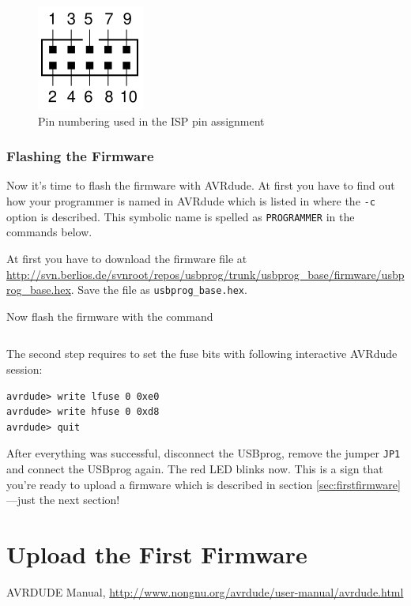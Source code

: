 \documentclass[bibtotoc,UKenglish,halfparskip,oneside,DIV12]{scrreprt}
\begin{document}
\begin{figure}[tb]
  \centering
  \includegraphics{images/isp}
  \caption{Pin numbering used in the ISP pin assignment}
  \label{fig:isp}
\end{figure}

\subsubsection{Flashing the Firmware}

Now it's time to flash the firmware with AVRdude. At first you have to find out how your programmer
is named in AVRdude which is listed in \cite{AVRdude} where the \texttt{-c} option is described.
This symbolic name is spelled as \texttt{PROGRAMMER} in the commands below.

At first you have to download the firmware file at
\url{http://svn.berlios.de/svnroot/repos/usbprog/trunk/usbprog\_base/firmware/usbprog\_base.hex}.
Save the file as \texttt{usbprog\_base.hex}.

Now flash the firmware with the command

\begin{lstlisting}[style=inline]
% avrdude -p m32 -c PROGRAMMER -U flash:w:usbprog_base.hex
\end{lstlisting}

The second step requires to set the fuse bits with following interactive AVRdude session:

\begin{lstlisting}[style=inline]
% avrdude -p m32 -c PROGRAMMER -t
avrdude> write lfuse 0 0xe0
avrdude> write hfuse 0 0xd8
avrdude> quit
\end{lstlisting}

After everything was successful, disconnect the USBprog, remove the jumper \texttt{JP1} and connect
the USBprog again. The red LED blinks now. This is a sign that you're ready to upload a firmware
which is described in section \vref{sec:firstfirmware}---just the next section!

\section{Upload the First Firmware}
\label{sec:firstfirmware}




\begin{thebibliography}{99}
   AVRDUDE Manual,
    \url{http://www.nongnu.org/avrdude/user-manual/avrdude.html}
\end{thebibliography}
\end{document}
